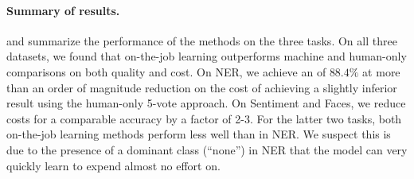 \paragraph{Summary of results.}
 and  summarize the performance of the methods on the three tasks.
On all three datasets, we found that on-the-job learning outperforms machine and human-only comparisons on both quality and cost. 
On NER, we achieve an \fone{} of $88.4\%$ at more than an order of magnitude reduction on the cost of achieving a slightly inferior result using the human-only 5-vote approach. On Sentiment and Faces, we reduce costs for a comparable accuracy by a factor of 2-3.
For the latter two tasks, both on-the-job learning methods perform less well than in NER. We suspect this is due to the presence of a dominant class (``none'') in NER that the model can very quickly learn to expend almost no effort on.


